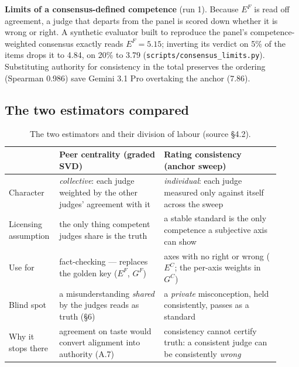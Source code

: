 \documentclass{article}
\begin{document}
\textbf{Limits of a consensus-defined competence} (run 1). Because \(E^{F}\) is read off agreement, a judge that departs from the panel is scored down whether it is wrong or right. A synthetic evaluator built to reproduce the panel's competence-weighted consensus exactly reads \(E^{F} = 5.15\); inverting its verdict on 5\% of the items drops it to 4.84, on 20\% to 3.79 (\texttt{scripts/consensus\_\allowbreak{}limits.py}). Substituting authority for consistency in the total preserves the ordering (Spearman 0.986) save Gemini 3.1 Pro overtaking the anchor (7.86).

\subsection{The two estimators compared}\label{the-two-estimators-compared}

\begin{table}[H]
\caption{The two estimators and their division of labour (source \S{}4.2).}
\label{tab-estimators}
\begin{center}\footnotesize
\begin{tabular}{>{\raggedright\arraybackslash}p{0.14\linewidth}>{\raggedright\arraybackslash}p{0.37\linewidth}>{\raggedright\arraybackslash}p{0.41\linewidth}}
\toprule\noalign{}
& Peer centrality (graded SVD) & Rating consistency (anchor sweep) \\
\midrule\noalign{}
Character & \emph{collective}: each judge weighted by the other judges' agreement with it & \emph{individual}: each judge measured only against itself across the sweep \\
Licensing assumption & the only thing competent judges share is the truth & a stable standard is the only competence a subjective axis can show \\
Use for & fact-checking --- replaces the golden key (\(E^{F}\), \(G^{F}\)) & axes with no right or wrong (\(E^{C}\); the per-axis weights in \(G^{C}\)) \\
Blind spot & a misunderstanding \emph{shared} by the judges reads as truth (\S{}6) & a \emph{private} misconception, held consistently, passes as a standard \\
Why it stops there & agreement on taste would convert alignment into authority (A.7) & consistency cannot certify truth: a consistent judge can be consistently \emph{wrong} \\
\bottomrule
\end{tabular}
\end{center}
\end{table}
\end{document}
